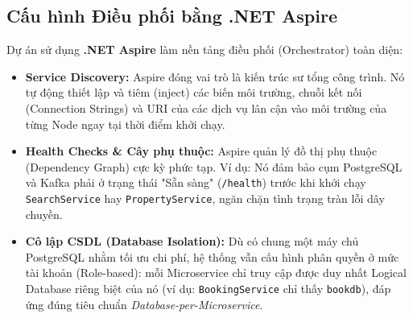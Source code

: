 \subsection{Cấu hình Điều phối bằng .NET Aspire}
Dự án sử dụng \textbf{.NET Aspire} làm nền tảng điều phối (Orchestrator) toàn diện:
\begin{itemize}
  \item \textbf{Service Discovery:} Aspire đóng vai trò là kiến trúc sư tổng công trình. Nó tự động thiết lập và tiêm (inject) các biến môi trường, chuỗi kết nối (Connection Strings) và URI của các dịch vụ lân cận vào môi trường của từng Node ngay tại thời điểm khởi chạy.
  \item \textbf{Health Checks \& Cây phụ thuộc:} Aspire quản lý đồ thị phụ thuộc (Dependency Graph) cực kỳ phức tạp. Ví dụ: Nó đảm bảo cụm PostgreSQL và Kafka phải ở trạng thái "Sẵn sàng" (\texttt{/health}) trước khi khởi chạy \texttt{SearchService} hay \texttt{PropertyService}, ngăn chặn tình trạng tràn lỗi dây chuyền.
  \item \textbf{Cô lập CSDL (Database Isolation):} Dù có chung một máy chủ PostgreSQL nhằm tối ưu chi phí, hệ thống vẫn cấu hình phân quyền ở mức tài khoản (Role-based): mỗi Microservice chỉ truy cập được duy nhất Logical Database riêng biệt của nó (ví dụ: \texttt{BookingService} chỉ thấy \texttt{bookdb}), đáp ứng đúng tiêu chuẩn \textit{Database-per-Microservice}.
\end{itemize}
